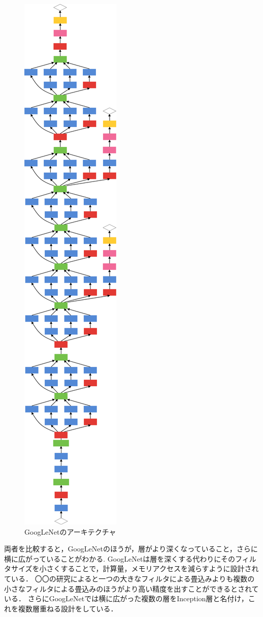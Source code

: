 {\begin{figure}[h]
  \centering
  \includegraphics[width=0.5\hsize]{./chap2/fig/googlenet.png}
  \caption{GoogLeNetのアーキテクチャ}
  \label{fig:googlenet}
\end{figure}
両者を比較すると，GoogLeNetのほうが，層がより深くなっていること，さらに横に広がっていることがわかる.
GoogLeNetは層を深くする代わりにそのフィルタサイズを小さくすることで，計算量，メモリアクセスを減らすように設計されている．
〇〇の研究によると一つの大きなフィルタによる畳込みよりも複数の小さなフィルタによる畳込みのほうがより高い精度を出すことができるとされている．
さらにGoogLeNetでは横に広がった複数の層をInception層と名付け，これを複数層重ねる設計をしている．

}
